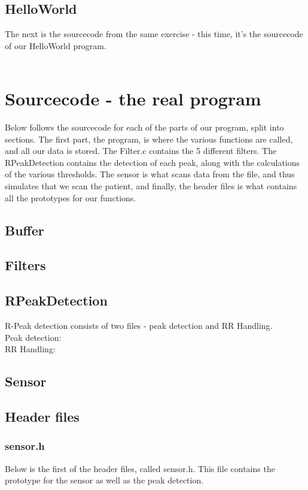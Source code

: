 \documentclass[12pt,a4paper]{article}
\begin{document}
\subsection{HelloWorld}
	The next is the sourcecode from the same exercise - this time, it's the sourcecode of our HelloWorld program.\\
	\\
	
	
\section{Sourcecode - the real program}
	Below follows the sourcecode for each of the parts of our program, split into sections. The first part, the program, is where the various functions are called, and all our data is stored. The Filter.c contains the 5 different filters. The RPeakDetection contains the detection of each peak, along with the calculations of the various thresholds. The sensor is what scans data from the file, and thus simulates that we scan the patient, and finally, the header files is what contains all the prototypes for our functions.
\subsection{Buffer}
		
\subsection{Filters}
	
\subsection{RPeakDetection}
	R-Peak detection consists of two files - peak detection and RR Handling.\\
	Peak detection:\\
		
	RR Handling:\\
		
\subsection{Sensor}
		
\subsection{Header files}
\subsubsection{sensor.h}
	Below is the first of the header files, called sensor.h. This file contains the prototype for the sensor as well as the peak detection.\\
	
\end{document}
